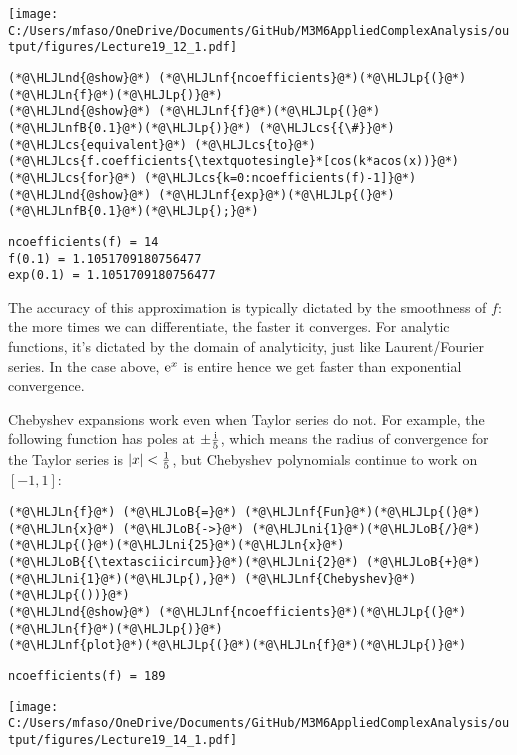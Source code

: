 \documentclass[12pt,landscape]{article}
\newcommand{\HLJLn}[1]{#1}
\newcommand{\HLJLnd}[1]{\textcolor[RGB]{214,102,97}{#1}}
\newcommand{\HLJLnf}[1]{\textcolor[RGB]{66,102,213}{#1}}
\newcommand{\HLJLnfB}[1]{\textcolor[RGB]{59,151,46}{#1}}
\newcommand{\HLJLni}[1]{\textcolor[RGB]{59,151,46}{#1}}
\newcommand{\HLJLoB}[1]{\textcolor[RGB]{102,102,102}{\textbf{#1}}}
\newcommand{\HLJLp}[1]{#1}
\newcommand{\HLJLcs}[1]{\textcolor[RGB]{153,153,119}{\textit{#1}}}
\def\I{ {\rm i} }
\def\E{ {\rm e} }
\def\cent#1{\begin{center}#1\end{center} }
\begin{document}
{\cent{\texttt{[image: C:/Users/mfaso/OneDrive/Documents/GitHub/M3M6AppliedComplexAnalysis/output/figures/Lecture19\_12\_1.pdf]}}

\begin{lstlisting}
(*@\HLJLnd{@show}@*) (*@\HLJLnf{ncoefficients}@*)(*@\HLJLp{(}@*)(*@\HLJLn{f}@*)(*@\HLJLp{)}@*)
(*@\HLJLnd{@show}@*) (*@\HLJLnf{f}@*)(*@\HLJLp{(}@*)(*@\HLJLnfB{0.1}@*)(*@\HLJLp{)}@*) (*@\HLJLcs{{\#}}@*) (*@\HLJLcs{equivalent}@*) (*@\HLJLcs{to}@*) (*@\HLJLcs{f.coefficients{\textquotesingle}*[cos(k*acos(x))}@*) (*@\HLJLcs{for}@*) (*@\HLJLcs{k=0:ncoefficients(f)-1]}@*)
(*@\HLJLnd{@show}@*) (*@\HLJLnf{exp}@*)(*@\HLJLp{(}@*)(*@\HLJLnfB{0.1}@*)(*@\HLJLp{);}@*)
\end{lstlisting}

\begin{lstlisting}
ncoefficients(f) = 14
f(0.1) = 1.1051709180756477
exp(0.1) = 1.1051709180756477
\end{lstlisting}


The accuracy of this approximation is typically dictated by the smoothness of $f$: the more times we can differentiate, the faster it converges. For analytic functions, it's dictated by the domain of analyticity, just like Laurent/Fourier series. In the case above, $\E^x$ is entire hence we get faster than exponential convergence.

Chebyshev expansions work even when Taylor series do not. For example, the following function has poles at $\pm {\I \over 5}$, which means the radius of convergence for the Taylor series is $|x| < {1 \over 5}$, but Chebyshev polynomials continue to work on $[-1,1]$:


\begin{lstlisting}
(*@\HLJLn{f}@*) (*@\HLJLoB{=}@*) (*@\HLJLnf{Fun}@*)(*@\HLJLp{(}@*) (*@\HLJLn{x}@*) (*@\HLJLoB{->}@*) (*@\HLJLni{1}@*)(*@\HLJLoB{/}@*)(*@\HLJLp{(}@*)(*@\HLJLni{25}@*)(*@\HLJLn{x}@*)(*@\HLJLoB{{\textasciicircum}}@*)(*@\HLJLni{2}@*) (*@\HLJLoB{+}@*) (*@\HLJLni{1}@*)(*@\HLJLp{),}@*) (*@\HLJLnf{Chebyshev}@*)(*@\HLJLp{())}@*)
(*@\HLJLnd{@show}@*) (*@\HLJLnf{ncoefficients}@*)(*@\HLJLp{(}@*)(*@\HLJLn{f}@*)(*@\HLJLp{)}@*)
(*@\HLJLnf{plot}@*)(*@\HLJLp{(}@*)(*@\HLJLn{f}@*)(*@\HLJLp{)}@*)
\end{lstlisting}
\begin{lstlisting}
ncoefficients(f) = 189
\end{lstlisting}
\cent{\texttt{[image: C:/Users/mfaso/OneDrive/Documents/GitHub/M3M6AppliedComplexAnalysis/output/figures/Lecture19\_14\_1.pdf]}}

}
\end{document}

